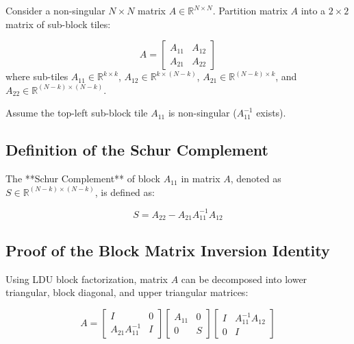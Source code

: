 Consider a non-singular $N \times N$ matrix $A \in \mathbb{R}^{N \times N}$. Partition matrix $A$ into a $2 \times 2$ matrix of sub-block tiles:

\begin{equation}
A = \begin{bmatrix} A_{11} & A_{12} \\ A_{21} & A_{22} \end{bmatrix}
\end{equation}
where sub-tiles $A_{11} \in \mathbb{R}^{k \times k}$, $A_{12} \in \mathbb{R}^{k \times (N-k)}$, $A_{21} \in \mathbb{R}^{(N-k) \times k}$, and $A_{22} \in \mathbb{R}^{(N-k) \times (N-k)}$.

Assume the top-left sub-block tile $A_{11}$ is non-singular ($A_{11}^{-1}$ exists).

\subsection{Definition of the Schur Complement}
The **Schur Complement** of block $A_{11}$ in matrix $A$, denoted as $S \in \mathbb{R}^{(N-k) \times (N-k)}$, is defined as:

\begin{mathbox}
\begin{equation}
S = A_{22} - A_{21} A_{11}^{-1} A_{12}
\end{equation}
\end{mathbox}

\subsection{Proof of the Block Matrix Inversion Identity}
Using LDU block factorization, matrix $A$ can be decomposed into lower triangular, block diagonal, and upper triangular matrices:

\begin{equation}
A = \begin{bmatrix} I & 0 \\ A_{21} A_{11}^{-1} & I \end{bmatrix} \begin{bmatrix} A_{11} & 0 \\ 0 & S \end{bmatrix} \begin{bmatrix} I & A_{11}^{-1} A_{12} \\ 0 & I \end{bmatrix}
\end{equation}

